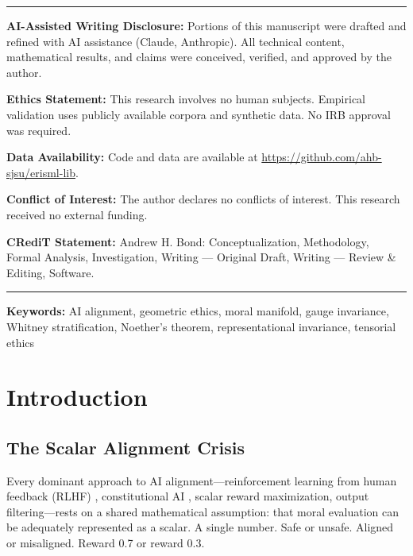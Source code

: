 \documentclass[12pt,letterpaper]{article}
\theoremstyle{definition}
\theoremstyle{remark}
\begin{document}
\begin{titlepage}
\vfill

\noindent\rule{\linewidth}{0.4pt}
\small
\noindent\textbf{AI-Assisted Writing Disclosure:} Portions of this manuscript were drafted and refined with AI assistance (Claude, Anthropic). All technical content, mathematical results, and claims were conceived, verified, and approved by the author.

\noindent\textbf{Ethics Statement:} This research involves no human subjects. Empirical validation uses publicly available corpora and synthetic data. No IRB approval was required.

\noindent\textbf{Data Availability:} Code and data are available at \url{https://github.com/ahb-sjsu/erisml-lib}.

\noindent\textbf{Conflict of Interest:} The author declares no conflicts of interest. This research received no external funding.

\noindent\textbf{CRediT Statement:} Andrew H. Bond: Conceptualization, Methodology, Formal Analysis, Investigation, Writing --- Original Draft, Writing --- Review \& Editing, Software.
\noindent\rule{\linewidth}{0.4pt}
\normalsize

\end{titlepage}

\noindent\textbf{Keywords:} AI alignment, geometric ethics, moral manifold, gauge invariance, Whitney stratification, Noether's theorem, representational invariance, tensorial ethics

\newpage
\tableofcontents
\newpage

\section{Introduction}
\label{sec:introduction}

\subsection{The Scalar Alignment Crisis}

Every dominant approach to AI alignment---reinforcement learning from human feedback (RLHF) \cite{christiano2017}, constitutional AI \cite{bai2022}, scalar reward maximization, output filtering---rests on a shared mathematical assumption: that moral evaluation can be adequately represented as a scalar. A single number. Safe or unsafe. Aligned or misaligned. Reward 0.7 or reward 0.3.
\end{document}

